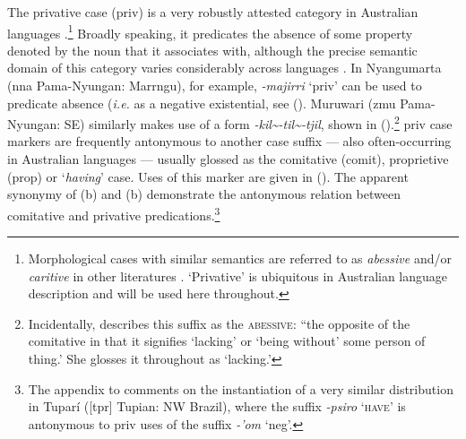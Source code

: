 The privative case (\gls{priv}) is a very robustly attested category in Australian languages \citep[84]{Dixon2002a}.\footnote{Morphological cases with similar semantics are referred to as \textit{abessive} and/or \textit{caritive} in other literatures \citep[\textit{e.g.} for Uralic in][]{Hamari2011,Hamari2015,Tamm2015}. `Privative' is ubiquitous in Australian language description and will be used here throughout.} Broadly speaking, it predicates the absence of some property denoted by the noun that it associates with, although the precise semantic domain of this category varies considerably across languages \citep[\textit{cf.} arguments for the predicative status of negative existential markers in ][139]{Veselinova2013}. In Nyangumarta (\gls{nna} Pama-Nyungan: Marrngu), for example, \textit{-majirri} `\gls{priv}' can be used to predicate absence (\textit{i.e.} as a negative existential, see (). Muruwari (\gls{zmu} Pama-Nyungan: SE) similarly makes use of a form \textit{-kil\textasciitilde-til\textasciitilde-tjil}, shown in ().\footnote{Incidentally, \citet[77]{Oates1988} describes this suffix as the \textsc{abessive}: ``the opposite of the comitative in that it signifies `lacking' or `being without' some person of thing.' She glosses it throughout as `lacking.'}
\gls{priv} case markers are frequently antonymous to another case suffix --- also often-occurring in Australian languages --- usually glossed as the comitative (\gls{comit}), proprietive (\gls{prop}) or `\textit{having}' case. Uses of this marker are given in (). The apparent synonymy of (b) and (b) demonstrate the antonymous relation between comitative and privative predications.\footnote{The appendix to \citet{Singerman2018} comments on the instantiation of a very similar distribution in Tuparí ([\gls{tpr}] Tupian: NW Brazil), where the suffix \textit{-psiro} \textsc{`have'} is antonymous to \gls{priv} uses of the suffix \textit{-'om} `\gls{neg}'. }


